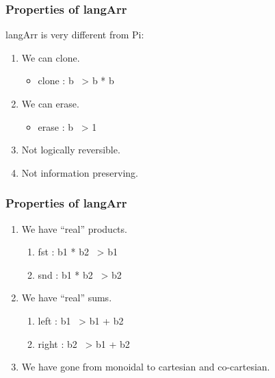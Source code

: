 \documentclass[svgnames,11pt]{beamer}
\begin{document}
\begin{frame}
\frametitle{ Properties of {{langArr}} }

{{langArr}} is very different from {{Pi}}:

\pause

\begin{enumerate}
\vfill
\item We can clone. 

  \begin{itemize}
  \item {{clone : b ~> b * b}} 
  \end{itemize}
\vfill
\item We can erase. 

  \begin{itemize}
  \item {{erase : b ~> 1}}
  \end{itemize}
  \vfill

\vfill
\item Not logically reversible.

\vfill
\item Not information preserving.

\end{enumerate}


\end{frame}

\begin{frame}
\frametitle{ Properties of {{langArr}} }

\begin{enumerate}
\item We have ``real'' products. 

  \begin{enumerate}
\vfill
  \item {{fst : b1 * b2 ~> b1}}
\vfill
  \item {{snd : b1 * b2 ~> b2}}
\vfill
  \end{enumerate}

\item We have ``real'' sums. 

  \begin{enumerate}
\vfill
  \item {{left : b1 ~> b1 + b2}}
\vfill
  \item {{right : b2 ~> b1 + b2}}
\vfill
  \end{enumerate}

\item We have gone from monoidal to cartesian and co-cartesian.

\vfill

\end{enumerate}
\end{frame}
\end{document}
